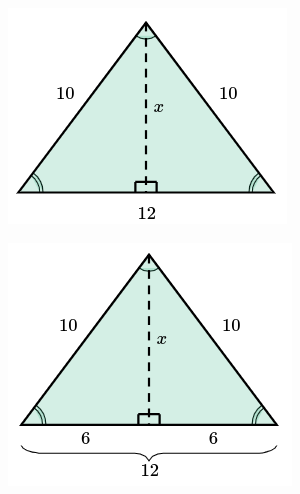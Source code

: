 \begin{solutionbox}{7.5cm}\footnotesize
    \begin{figure}
        \centering\captionsetup[subfigure]{justification=centering}
        \begin{subfigure}{\linewidth}
            \includegraphics[width=\linewidth]{../images/area_isoseles_01a.png}
            \caption{}
            \label{subfig:area_isoseles_01a}
        \end{subfigure}
        \begin{subfigure}{\linewidth}
            \includegraphics[width=\linewidth]{../images/area_isoseles_01b.png}

\end{subfigure}
\end{figure}
\end{solutionbox}
